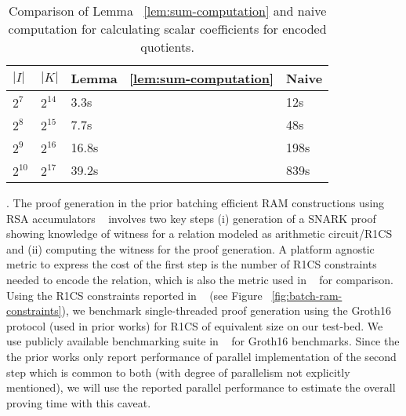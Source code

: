 \begin{table}[htbp]
    \centering
    \begin{tabularx}{0.45\textwidth}{@{}XXXX@{}}
        \toprule
        $|I|$ & $|K|$ & Lemma ~\ref{lem:sum-computation} & Naive \\ \midrule
        $2^7$ & $2^{14}$ & 3.3s  & 12s \\
        $2^8$ & $2^{15}$ & 7.7s  & 48s \\
        $2^9$ & $2^{16}$ & 16.8s & 198s \\
        $2^{10}$ & $2^{17}$ & 39.2s & 839s \\
        \bottomrule
    \end{tabularx}
    \caption{Comparison of Lemma ~\ref{lem:sum-computation} and naive computation for calculating
    scalar coefficients for encoded quotients.}
    \label{tbl:sum-computation-compare}
\end{table}

. The proof generation in the prior batching efficient RAM constructions
using RSA accumulators ~\cite{USENIX:OWWB20,CCS:CFHKKO22} involves two key steps (i) generation of a SNARK
proof showing knowledge of witness for a relation modeled as arithmetic circuit/R1CS and (ii) computing the witness
for the proof generation. A platform agnostic metric to express the cost of the first step is the number of R1CS
constraints needed to encode the relation, which is also the metric used in ~\cite{CCS:CFHKKO22} for comparison.
Using the R1CS constraints reported in ~\cite{USENIX:OWWB20,CCS:CFHKKO22} (see Figure ~\ref{fig:batch-ram-constraints}),
we benchmark single-threaded proof generation
using the \textsf{Groth16} protocol (used in prior works) for R1CS of equivalent size on our test-bed. We use publicly
available benchmarking suite in ~\cite{ark-groth-16} for \textsf{Groth16} benchmarks. Since the
the prior works only report performance of parallel implementation of the second step which is common to both (with
degree of parallelism not explicitly mentioned), we will use the reported parallel performance to estimate the
overall proving time with this caveat. 

